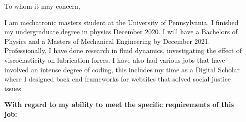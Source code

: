 \par{\Large
To whom it may concern,
}

\par{\large

\quad I am mechatronic masters student at the University of Pennsylvania. I finished my undergraduate degree in physics December 2020. I will have a Bachelors of Physics and a Masters of Mechanical Engineering by December 2021.  Professionally, I have done research in fluid dynamics, investigating the effect of viscoelasticity on lubrication forces. I have also had various jobs that have involved an intense degree of coding, this includes my time as a Digital Scholar where I designed back end frameworks for websites that solved social justice issues.

}

\textbf{\Large
With regard to my ability to meet the specific requirements of this job:
}

